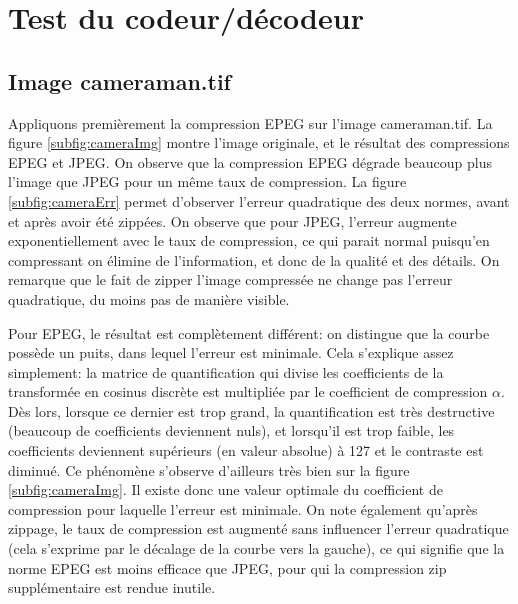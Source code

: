 \documentclass[12pt]{article}
\begin{document}
\section{Test du codeur/décodeur}
\subsection{Image \textsf{cameraman.tif}}
Appliquons premièrement la compression EPEG sur l'image \textsf{cameraman.tif}. La figure \autoref{subfig:cameraImg} montre l'image originale, et le résultat des compressions EPEG et JPEG. On observe que la compression EPEG dégrade beaucoup plus l'image que JPEG pour un même taux de compression. 
La figure \autoref{subfig:cameraErr} permet d'observer l'erreur quadratique des deux normes, avant et après avoir été zippées. On observe que pour JPEG, l'erreur augmente exponentiellement avec le taux de compression, ce qui parait normal puisqu'en compressant on élimine de l'information, et donc de la qualité et des détails. On remarque que le fait de zipper l'image compressée ne change pas l'erreur quadratique, du moins pas de manière visible. 

Pour EPEG, le résultat est complètement différent: on distingue que la courbe possède un puits, dans lequel l'erreur est minimale. Cela s'explique assez simplement: la matrice de quantification qui divise les coefficients de la transformée en cosinus discrète est multipliée par le coefficient de compression $\alpha$. Dès lors, lorsque ce dernier est trop grand, la quantification est très destructive (beaucoup de coefficients deviennent nuls), et lorsqu'il est trop faible, les coefficients deviennent supérieurs (en valeur absolue) à 127 et le contraste est diminué. Ce phénomène s'observe d'ailleurs très bien sur la figure \autoref{subfig:cameraImg}. Il existe donc une valeur optimale du coefficient de compression pour laquelle l'erreur est minimale. On note également qu'après zippage, le taux de compression est augmenté sans influencer l'erreur quadratique (cela s'exprime par le décalage de la courbe vers la gauche), ce qui signifie que la norme EPEG est moins efficace que JPEG, pour qui la compression zip supplémentaire est rendue inutile.
\end{document}
